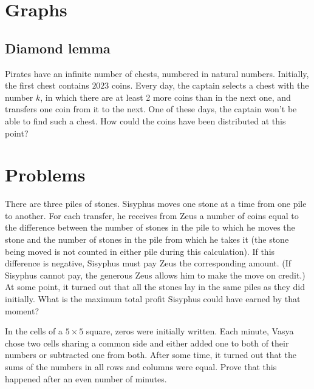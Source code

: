 \section{Graphs}

\subsection{Diamond lemma}

\begin{example}
    Pirates have an infinite number of chests, numbered in natural numbers. Initially, the first chest contains $2023$ coins. Every day, the captain selects a chest with the number $k$, in which there are at least 2 more coins than in the next one, and transfers one coin from it to the next. One of these days, the captain won't be able to find such a chest. How could the coins have been distributed at this point?
\end{example}

\section{Problems}

\begin{problem} [Russia 1995]
There are three piles of stones. Sisyphus moves one stone at a time from one pile to another. For each transfer, he receives from Zeus a number of coins equal to the difference between the number of stones in the pile to which he moves the stone and the number of stones in the pile from which he takes it (the stone being moved is not counted in either pile during this calculation). If this difference is negative, Sisyphus must pay Zeus the corresponding amount. (If Sisyphus cannot pay, the generous Zeus allows him to make the move on credit.) At some point, it turned out that all the stones lay in the same piles as they did initially. What is the maximum total profit Sisyphus could have earned by that moment?
\end{problem}

\begin{problem} [Russia 2008]
In the cells of a $5 \times 5$ square, zeros were initially written. Each minute, Vasya chose two cells sharing a common side and either added one to both of their numbers or subtracted one from both. After some time, it turned out that the sums of the numbers in all rows and columns were equal. Prove that this happened after an even number of minutes.
\end{problem}

